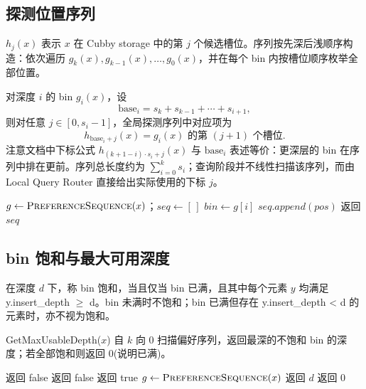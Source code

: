 \subsection{探测位置序列}

\(h_j(x)\) 表示 \(x\) 在 Cubby storage 中的第 \(j\) 个候选槽位。序列按先深后浅顺序构造：依次遍历 \(g_k(x),g_{k-1}(x),\ldots,g_0(x)\)，并在每个 bin 内按槽位顺序枚举全部位置。

对深度 \(i\) 的 bin \(g_i(x)\)，设
\[
  \mathrm{base}_i=s_k+s_{k-1}+\cdots+s_{i+1},
\]
则对任意 \(j\in[0,s_i-1]\)，全局探测序列中对应项为
\[
  h_{\mathrm{base}_i+j}(x)=g_i(x)\text{ 的第 }(j+1)\text{ 个槽位}.
\]
注意文档中下标公式 \(h_{(k+1-i)\cdot s_i+j}(x)\) 与 \(\mathrm{base}_i\) 表述等价：更深层的 bin 在序列中排在更前。序列总长度约为 \(\displaystyle\sum_{i=0}^{k}s_i\)；查询阶段并不线性扫描该序列，而由 Local Query Router 直接给出实际使用的下标 \(j\)\cite{bender2022otsh,pagh2004linear}。

\begin{algorithm}[htbp]
  \caption{ProbeSequence：探测位置序列（先深后浅）}
  \label{alg:probe-seq}
  \begin{algorithmic}[1]
      \State $g\gets\Call{PreferenceSequence}{x}$；$\mathit{seq}\gets[\,]$
        \State $\mathit{bin}\gets g[i]$
          \State $\mathit{seq.append(pos)}$
        \EndFor
      \EndFor
      \State 返回 $\mathit{seq}$ 
    \EndFunction
  \end{algorithmic}
\end{algorithm}

\subsection{bin 饱和与最大可用深度}

在深度 \(d\) 下，称 bin 饱和，当且仅当 bin 已满，且其中每个元素 \(y\) 均满足 y.insert\_depth \(\ge\) d。bin 未满时不饱和；bin 已满但存在 y.insert\_depth < d 的元素时，亦不视为饱和。

GetMaxUsableDepth(\(x\)) 自 \(k\) 向 0 扫描偏好序列，返回最深的不饱和 bin 的深度；若全部饱和则返回 0(说明已满)。

\begin{algorithm}[htbp]
  \caption{IsSaturated 与 GetMaxUsableDepth}
  \label{alg:saturated}
  \begin{algorithmic}[1]
       \State 返回 false \EndIf
         \State 返回 false \EndIf
      \EndFor
      \State 返回 true
    \EndFunction
      \State $g\gets\Call{PreferenceSequence}{x}$
          \State 返回 $d$
        \EndIf
      \EndFor
      \State 返回 $0$
    \EndFunction
  \end{algorithmic}
\end{algorithm}

